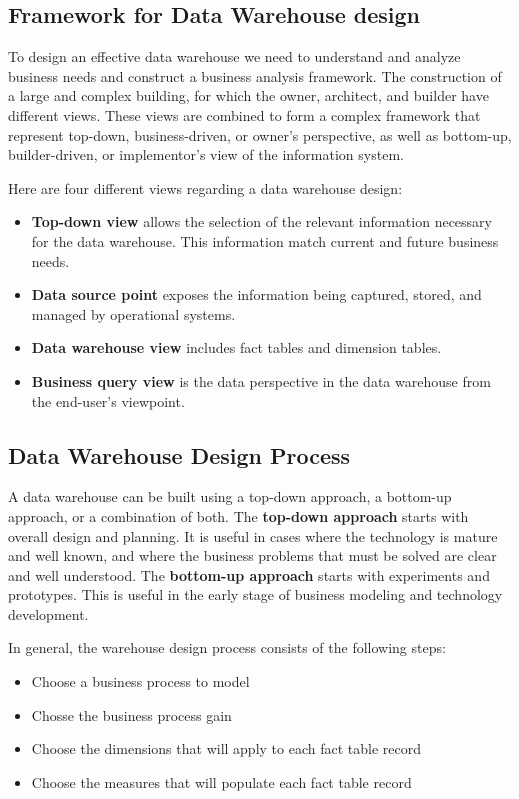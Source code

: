 	\subsection{Framework for Data Warehouse design}

		To design an effective data warehouse we need to understand and analyze
		business needs and construct  a business analysis framework. The construction
		of a large and complex building, for which the owner, architect, and builder
		have different views. These views are combined to form a complex framework 
		that represent top-down, business-driven, or owner's perspective, as 
		well as bottom-up, builder-driven, or implementor's view of the information system.

		Here are four different views regarding a data warehouse design:

		\begin{itemize}
			\item {\bf Top-down view} allows the selection of the relevant information
			necessary for the data warehouse. This information match current and 
			future business needs. 
			\item {\bf Data source point} exposes the information being captured, stored,
			and managed by operational systems. 
			\item {\bf Data warehouse view} includes fact tables and dimension tables. 
			\item {\bf Business query view} is the data perspective in the data warehouse
			from the end-user's viewpoint. 
		\end{itemize}

	\subsection{Data Warehouse Design Process}

		A data warehouse can be built using a top-down approach, a bottom-up approach,
		or a combination of both. 
		The {\bf top-down approach} starts with overall design and planning.
		It is useful in cases where the technology is mature and well known, and
		where the business problems that must be solved are clear and well understood.
		The {\bf bottom-up approach} starts with experiments and prototypes. 
		This is useful in the early stage of business modeling and technology development. 

		In general, the warehouse design process consists of the following steps:
		\begin{itemize}
			\item Choose a business process to model
			\item Chosse the business process gain
			\item Choose the dimensions that will apply to each fact table record
			\item Choose the measures that will populate each fact table record
		\end{itemize}

